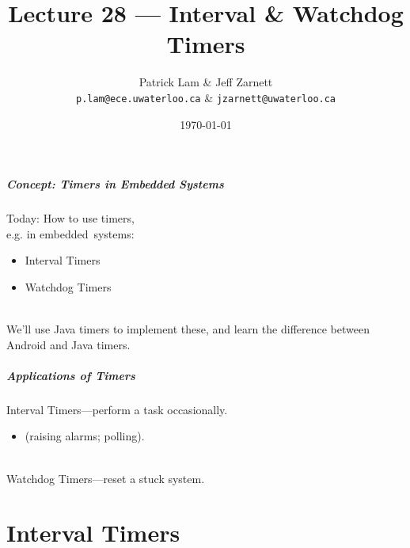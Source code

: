 

\title{Lecture 28 --- Interval \& Watchdog Timers}

\author{Patrick Lam \& Jeff Zarnett\\ \small \texttt{p.lam@ece.uwaterloo.ca} \& \texttt{jzarnett@uwaterloo.ca}}
\date{\today}



\begin{frame}
  \titlepage
\end{frame}


\begin{frame}
\frametitle{Concept: Timers in Embedded Systems}

\begin{changemargin}{1cm}
\large

Today: How to use timers,\\ \qquad \qquad e.g. in embedded~systems:
\begin{itemize}
\item Interval Timers
\item Watchdog Timers
\end{itemize}
~\\
We'll use Java timers to implement these,
and learn the difference between Android and Java timers.

\end{changemargin}

\end{frame}

\begin{frame}
\frametitle{Applications of Timers}

\Large
\begin{changemargin}{1.3cm}
Interval Timers---perform a task occasionally.\\[-0.5em]
\begin{itemize}\item (raising alarms; polling).
\end{itemize}
~\\
Watchdog Timers---reset a stuck system.
~\\[1em]

\end{changemargin}

\end{frame}

\part{Interval Timers}
\frame{\partpage}

